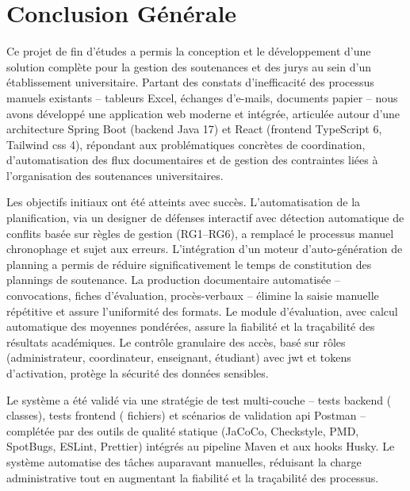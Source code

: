 \newpage
\section*{Conclusion Générale}
\label{sec:conclusion_generale}

Ce projet de fin d'études a permis la conception et le développement d'une solution complète pour la gestion des soutenances et des jurys au sein d'un établissement universitaire. Partant des constats d'inefficacité des processus manuels existants -- tableurs Excel, échanges d'e-mails, documents papier -- nous avons développé une application web moderne et intégrée, articulée autour d'une architecture Spring Boot (backend Java 17) et React (frontend TypeScript 6, Tailwind \acrshort{css} 4), répondant aux problématiques concrètes de coordination, d'automatisation des flux documentaires et de gestion des contraintes liées à l'organisation des soutenances universitaires.

Les objectifs initiaux ont été atteints avec succès. L'automatisation de la planification, via un designer de défenses interactif avec détection automatique de conflits basée sur  règles de gestion (RG1--RG6), a remplacé le processus manuel chronophage et sujet aux erreurs. L'intégration d'un moteur d'auto-génération de planning a permis de réduire significativement le temps de constitution des plannings de soutenance. La production documentaire automatisée -- convocations, fiches d'évaluation, procès-verbaux -- élimine la saisie manuelle répétitive et assure l'uniformité des formats. Le module d'évaluation, avec calcul automatique des moyennes pondérées, assure la fiabilité et la traçabilité des résultats académiques. Le contrôle granulaire des accès, basé sur  rôles (administrateur, coordinateur, enseignant, étudiant) avec \acrshort{jwt} et tokens d'activation, protège la sécurité des données sensibles.

Le système a été validé via une stratégie de test multi-couche --  tests backend ( classes),  tests frontend ( fichiers) et  scénarios de validation \acrshort{api} Postman -- complétée par des outils de qualité statique (JaCoCo, Checkstyle, PMD, SpotBugs, ESLint, Prettier) intégrés au pipeline Maven et aux hooks Husky. Le système automatise des tâches auparavant manuelles, réduisant la charge administrative tout en augmentant la fiabilité et la traçabilité des processus.

